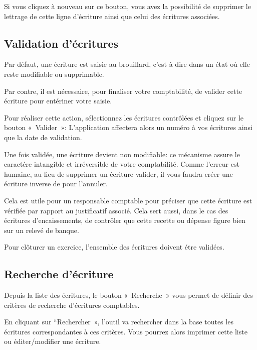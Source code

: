 \documentclass[a4paper,10pt,oneside,french]{sphinxmanual}
\begin{document}
Si vous cliquez à nouveau sur ce bouton, vous avez la possibilité de supprimer
le lettrage de cette ligne d’écriture ainsi que celui des écritures associées.


\subsection{Validation d’écritures}
\label{\detokenize{accounting/entity:validation-d-ecritures}}
Par défaut, une écriture est saisie au brouillard, c’est à dire dans un
état où elle reste modifiable ou supprimable.

Par contre, il est nécessaire, pour finaliser votre comptabilité, de valider cette
écriture pour entériner votre saisie.

Pour réaliser cette action, sélectionnez les écritures contrôlées et
cliquez sur le bouton « Valider »: L’application affectera alors un
numéro à vos écritures ainsi que la date de validation.

Une fois validée, une écriture devient non modifiable: ce mécanisme assure le
caractére intangible et irréversible de votre comptabilité.
Comme l’erreur est humaine, au lieu de supprimer un écriture valider, il vous faudra
créer une écriture inverse de pour l’annuler.

Cela est utile pour un responsable comptable pour préciser que cette
écriture est vérifiée par rapport au justificatif associé.
Cela sert aussi, dans le cas des écritures d’encaissements, de contrôler que
cette recette ou dépense figure bien sur un relevé de banque.

Pour clôturer un exercice, l’ensemble des écritures doivent étre validées.


\subsection{Recherche d’écriture}
\label{\detokenize{accounting/entity:recherche-d-ecriture}}
Depuis la liste des écritures, le bouton « Recherche » vous permet
de définir des critères de recherche d’écritures comptables.
\begin{quote}

\noindent{}
\end{quote}

En cliquant sur “Rechercher », l’outil va rechercher dans la base
toutes les écritures correspondantes à ces critères. Vous pourrez alors
imprimer cette liste ou éditer/modifier une écriture.
\end{document}
